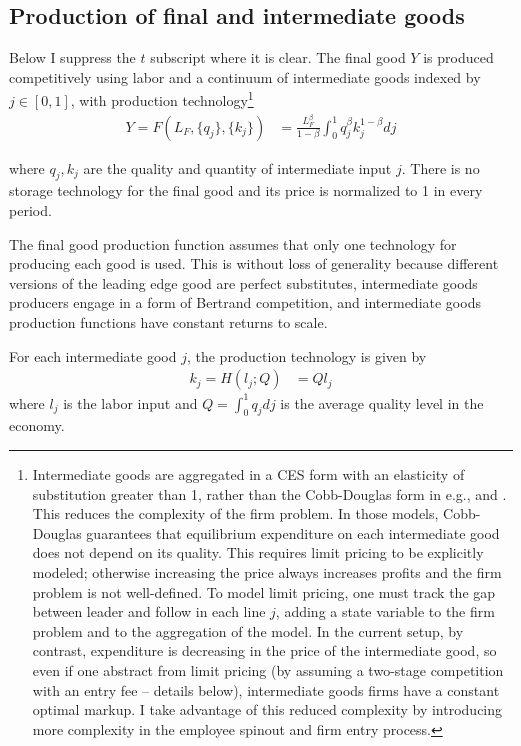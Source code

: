 \documentclass[12pt,english]{article}
\theoremstyle{remark}
\begin{document}
\subsection{Production of final and intermediate goods}

Below I suppress the $t$ subscript where it is clear. The final good $Y$ is produced competitively using labor and a continuum of intermediate goods indexed by $j \in [0,1]$, with production technology\footnote{Intermediate goods are aggregated in a CES form with an elasticity of substitution greater than 1, rather than the Cobb-Douglas form in e.g., \cite{grossman_quality_1991} and \cite{baslandze_spinout_2019}. This reduces the complexity of the firm problem. In those models, Cobb-Douglas guarantees that equilibrium expenditure on each intermediate good does not depend on its quality. This requires limit pricing to be explicitly modeled; otherwise increasing the price always increases profits and the firm problem is not well-defined. To model limit pricing, one must track the gap between leader and follow in each line $j$, adding a state variable to the firm problem and to the aggregation of the model. In the current setup, by contrast, expenditure is decreasing in the price of the intermediate good, so even if one abstract from limit pricing (by assuming a two-stage competition with an entry fee -- details below), intermediate goods firms have a constant optimal markup. I take advantage of this reduced complexity by introducing more complexity in the employee spinout and firm entry process.}
\begin{align}
Y = F(L_F,\{q_j\},\{k_j\}) &= \frac{L_F^{\beta}}{1-\beta} \int_0^1 q_j^{\beta} k_j^{1-\beta} dj \label{final_goods_production}
\end{align}

where $q_j,k_j$ are the quality and quantity of intermediate input $j$. 
There is no storage technology for the final good and its price is normalized to 1 in every period. 

The final good production function assumes that only one technology for producing each good is used. This is without loss of generality because different versions of the leading edge good are perfect substitutes, intermediate goods producers engage in a form of Bertrand competition, and intermediate goods production functions have constant returns to scale. 

For each intermediate good $j$, the production technology is given by
\begin{align*}
k_j = H(l_j;Q) &= Q l_j
\end{align*}
where $l_j$ is the labor input and $Q = \int_0^1 q_j dj$ is the average quality level in the economy. 
\end{document}
